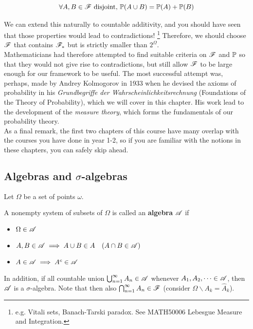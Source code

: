 $$\forall A,B \in \mathcal{F} \text{ disjoint, } \mathbb{P}(A\cup B) = \mathbb{P}(A) + \mathbb{P}(B)$$

We can extend this naturally to countable additivity, and you should have seen that those properties would lead to contradictions! \footnote{e.g. Vitali sets, Banach-Tarski paradox. See MATH50006 Lebesgue Measure and Integration.} Therefore, we should choose $\mathcal{F}$ that contains $\mathcal{F}_*$ but is strictly smaller than $2^\Omega$.\\

Mathematicians had therefore attempted to find suitable criteria on $\mathcal{F}$ and $\mathbb{P}$ so that they would not give rise to contradictions, but still allow $\mathcal{F}$ to be large enough for our framework to be useful. The most successful attempt was, perhaps, made by Andrey Kolmogorov in 1933 when he devised the axioms of probability in his \textit{Grundbegriffe der Wahrscheinlichkeitsrechnung} (Foundations of the Theory of Probability), which we will cover in this chapter. His work lead to the development of the \textit{measure theory}, which forms the fundamentals of our probability theory.\\

As a final remark, the first two chapters of this course have many overlap with the courses you have done in year 1-2, so if you are familiar with the notions in these chapters, you can safely skip ahead.
\newpage

\subsection{Algebras and $\sigma$-algebras}
Let $\Omega$ be a set of points $\omega$. 
\begin{definition} A nonempty system of subsets of $\Omega$ is called an \textbf{algebra} $\mathcal{A}$ if 
    \begin{itemize}
        \item $\Omega \in \mathcal{A}$
        \item $A,B \in \mathcal{A} \implies A \cup B \in A \quad (A \cap B \in \mathcal{A})$
        \item $A \in \mathcal{A} \implies A^c \in \mathcal{A}$
    \end{itemize}
In addition, if all countable union $\bigcup_{n=1}^\infty A_n \in \mathcal{A}$ whenever $A_1, A_2, \dots \in \mathcal{A}$, then $\mathcal{A}$ is a $\sigma$-algebra. Note that then also $\bigcap_{n=1}^\infty A_n \in \mathcal{F}$ (consider $\Omega \backslash A_k = \hat{A}_k$).
\end{definition}


